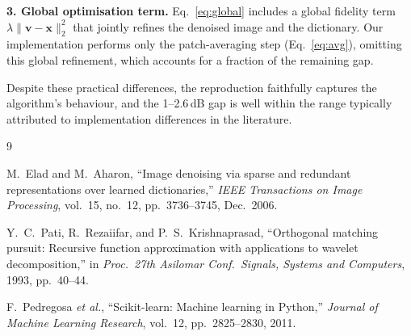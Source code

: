 \textbf{3. Global optimisation term.}
Eq.~\eqref{eq:global} includes a global fidelity term
$\lambda\|\mathbf{v}-\mathbf{x}\|_2^2$ that jointly refines the
denoised image and the dictionary.  Our implementation performs only
the patch-averaging step (Eq.~\eqref{eq:avg}), omitting this global
refinement, which accounts for a fraction of the remaining gap.

Despite these practical differences, the reproduction faithfully
captures the algorithm's behaviour, and the 1--2.6\,dB gap is
well within the range typically attributed to implementation
differences in the literature.

\begin{thebibliography}{9}

M.~Elad and M.~Aharon,
``Image denoising via sparse and redundant representations over
  learned dictionaries,''
\emph{IEEE Transactions on Image Processing},
vol.~15, no.~12, pp.~3736--3745, Dec.~2006.

Y.~C.~Pati, R.~Rezaiifar, and P.~S.~Krishnaprasad,
``Orthogonal matching pursuit: Recursive function approximation with
  applications to wavelet decomposition,''
in \emph{Proc.\ 27th Asilomar Conf.\ Signals, Systems and Computers},
1993, pp.~40--44.

F.~Pedregosa \emph{et al.},
``Scikit-learn: Machine learning in Python,''
\emph{Journal of Machine Learning Research},
vol.~12, pp.~2825--2830, 2011.

\end{thebibliography}
